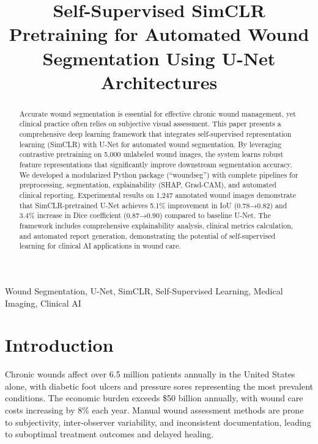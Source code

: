 \documentclass[conference]{IEEEtran}
\begin{document}
\title{Self-Supervised SimCLR Pretraining for Automated Wound Segmentation Using U-Net Architectures}

\author{
}

\maketitle

\begin{abstract}
Accurate wound segmentation is essential for effective chronic wound management, yet clinical practice often relies on subjective visual assessment. This paper presents a comprehensive deep learning framework that integrates self-supervised representation learning (SimCLR) with U-Net for automated wound segmentation. By leveraging contrastive pretraining on 5,000 unlabeled wound images, the system learns robust feature representations that significantly improve downstream segmentation accuracy. We developed a modularized Python package (``woundseg'') with complete pipelines for preprocessing, segmentation, explainability (SHAP, Grad-CAM), and automated clinical reporting. Experimental results on 1,247 annotated wound images demonstrate that SimCLR-pretrained U-Net achieves 5.1\% improvement in IoU (0.78→0.82) and 3.4\% increase in Dice coefficient (0.87→0.90) compared to baseline U-Net. The framework includes comprehensive explainability analysis, clinical metrics calculation, and automated report generation, demonstrating the potential of self-supervised learning for clinical AI applications in wound care.
\end{abstract}

\begin{IEEEkeywords}
Wound Segmentation, U-Net, SimCLR, Self-Supervised Learning, Medical Imaging, Clinical AI
\end{IEEEkeywords}

\section{Introduction}
Chronic wounds affect over 6.5 million patients annually in the United States alone, with diabetic foot ulcers and pressure sores representing the most prevalent conditions. The economic burden exceeds \$50 billion annually, with wound care costs increasing by 8\% each year. Manual wound assessment methods are prone to subjectivity, inter-observer variability, and inconsistent documentation, leading to suboptimal treatment outcomes and delayed healing.
\end{document}
